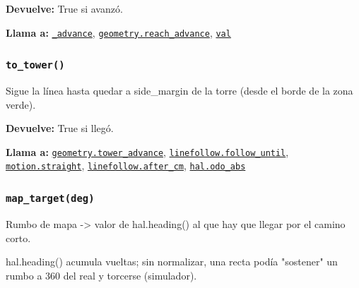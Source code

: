 \par{}\par\smallskip
\noindent\textbf{Devuelve:} True si avanzó.\par
\noindent\textbf{Llama a:} \hyperref[fn:autonomous:-advance]{\texttt{\_\allowbreak{}advance}}, \hyperref[fn:geometry:reach-advance]{\texttt{geometry.reach\_\allowbreak{}advance}}, \hyperref[fn:autonomous:val]{\texttt{val}}\par

\subsubsection{\texttt{to\_\allowbreak{}tower()}}\label{fn:autonomous:to-tower}
\noindent Sigue la línea hasta quedar a side\_margin de la torre (desde el borde de la zona verde).

\noindent\textbf{Devuelve:} True si llegó.\par
\noindent\textbf{Llama a:} \hyperref[fn:geometry:tower-advance]{\texttt{geometry.tower\_\allowbreak{}advance}}, \hyperref[fn:linefollow:follow-until]{\texttt{linefollow.follow\_\allowbreak{}until}}, \hyperref[fn:motion:straight]{\texttt{motion.straight}}, \hyperref[fn:linefollow:after-cm]{\texttt{linefollow.after\_\allowbreak{}cm}}, \hyperref[fn:hal:odo-abs]{\texttt{hal.odo\_\allowbreak{}abs}}\par

\subsubsection{\texttt{map\_\allowbreak{}target(deg)}}\label{fn:autonomous:map-target}
\noindent Rumbo de mapa -> valor de hal.heading() al que hay que llegar por el camino corto.

hal.heading() acumula vueltas; sin normalizar, una recta podía "sostener" un rumbo a 360\textdegree{} del real y torcerse (simulador).

